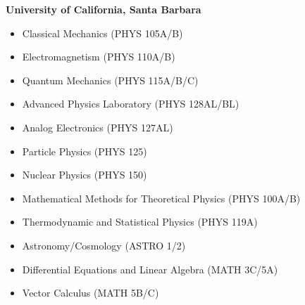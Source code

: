 \textbf{University of California, Santa Barbara}\\[-2.3ex]
\begin{itemize}[leftmargin=4ex] \itemsep -2pt
\item Classical Mechanics ({\footnotesize{PHYS 105A/B}}) 
\item Electromagnetism ({\footnotesize{PHYS 110A/B}}) 
\item Quantum Mechanics ({\footnotesize{PHYS 115A/B/C}}) 
\item Advanced Physics Laboratory ({\footnotesize{PHYS 128AL/BL}}) 
\item Analog Electronics ({\footnotesize{PHYS 127AL}}) 
\item Particle Physics ({\footnotesize{PHYS 125}}) 
\item Nuclear Physics ({\footnotesize{PHYS 150}}) 
\item Mathematical Methods for Theoretical Physics ({\footnotesize{PHYS 100A/B}}) 
\item Thermodynamic and Statistical Physics ({\footnotesize{PHYS 119A}}) 
\item Astronomy/Cosmology ({\footnotesize{ASTRO 1/2}})
\item Differential Equations and Linear Algebra ({\footnotesize{MATH 3C/5A}}) 
\item Vector Calculus ({\footnotesize{MATH 5B/C}}) 
\end{itemize}
